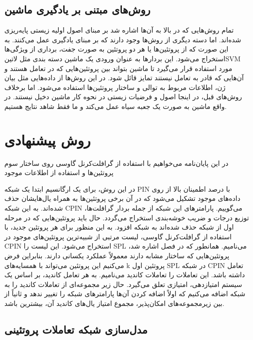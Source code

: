 \subsection{روش‌های مبتنی بر یادگیری ماشین}
تمام روش‌هایی که در بالا به آن‌ها اشاره شد بر مبنای اصول اولیه زیستی پایه‌ریزی شده‌اند. اما دسته دیگری از روش‌ها وجود دارند که بر مبنای یادگیری عمل می‌کنند. به این صورت که از پروتئین‌ها یا هر دو پروتئین به صورت جفت، برداری از ویژگی‌ها استخراج می‌شود. این بردارها به عنوان ورودی یک ماشین دسته بندی مثل ‌لاتین{SVM} مورد استفاده قرار می‌گیرد تا ماشین بتواند بین پروتئین‌هایی که در تعامل هستند و آن‌هایی که قادر به تعامل نیستند تمایز قائل شود. در این روش‌ها از داده‌هایی مثل بیان ژن‌، اطلاعات مربوط به توالی و ساختار پروتئین‌ها استفاده می‌شود. اما برخلاف روش‌های قبل، در اینجا اصول و فرضیات زیستی در نحوه کار ماشین دخیل نیستند. در واقع ماشین به صورت یک جعبه سیاه عمل می‌کند و ما فقط شاهد نتایج هستیم.

\section{روش پیشنهادی}
در این پایان‌نامه می‌خواهیم با استفاده از گرافلت‌کرنل گاوسی روی ساختار سوم پروتئین‌ها و استفاده از اطلاعات موجود 


در این روش، برای یک ارگانسیم ابتدا یک شبکه PIN با درصد اطمینان بالا از روی داده‌های موجود تشکیل می‌شود که در آن برخی پروتئین‌ها به همراه یال‌هایشان حذف شده‌اند. به این شبکه CPIN می‌گوییم. پارامترهای این شبکه از جمله بردار گرافلت‌ها، توزیع درجات و ضریب خوشه‌بندی استخراج می‌گردد. حال باید پروتئین‌هایی که در مرحله اول از شبکه حذف شده‌اند به شبکه افزود. به این منظور برای هر پروتئین جدید، با استفاده از گرافلت‌کرنل گاوسی، لیست مرتبی از شبیه‌ترین پروتئین‌های موجود در CPIN استخراج می‌شود. این لیست را SPL می‌نامیم. همانطور که در فصل  اشاره شد، پروتئین‌هایی که ساختار مشابه دارند معمولاً عملکرد یکسانی دارند. بنابراین فرض می‌کنیم این پروتئین می‌تواند با همسایه‌های k پروتئین اول SPL در شبکه CPIN تعامل داشته باشد. این تعاملات را تعاملات کاندید می‌نامیم. به هر تعامل کاندید، بر اساس یک سیستم امتیازدهی، امتیازی تعلق می‌گیرد. حال زیر مجموعه‌ای از تعاملات کاندید را به شبکه اضافه می‌کنیم که اولاً اضافه کردن آن‌ها پارامترهای شبکه را تغییر ندهد و ثانیاً از بین زیرمجموعه‌های امکان‌پذیر، مجموع امتیاز‌ یال‌های کاندید آن، بیشترین باشد.


\subsection{مدل‌سازی شبکه تعاملات پروتئینی}

\subsection{}
